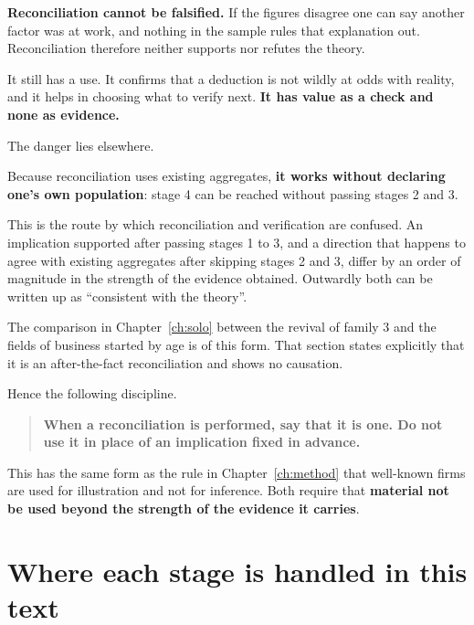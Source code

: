 \textbf{Reconciliation cannot be falsified.} If the figures disagree one can say another
factor was at work, and nothing in the sample rules that explanation out. Reconciliation
therefore neither supports nor refutes the theory.

It still has a use. It confirms that a deduction is not wildly at odds with reality, and it
helps in choosing what to verify next.
\textbf{It has value as a check and none as evidence.}

The danger lies elsewhere.

\begin{remark}
\label{rem:comparison-skips-stages}
Because reconciliation uses existing aggregates, \textbf{it works without declaring one's own
population}: stage 4 can be reached without passing stages 2 and 3.

This is the route by which reconciliation and verification are confused. An implication
supported after passing stages 1 to 3, and a direction that happens to agree with existing
aggregates after skipping stages 2 and 3, differ by an order of magnitude in the strength of
the evidence obtained. Outwardly both can be written up as ``consistent with the theory''.
\end{remark}

The comparison in Chapter~\ref{ch:solo} between the revival of family 3 and the fields of
business started by age is of this form. That section states explicitly that it is an
after-the-fact reconciliation and shows no causation.

Hence the following discipline.

\begin{quote}
\textbf{When a reconciliation is performed, say that it is one. Do not use it in place of an
implication fixed in advance.}
\end{quote}

This has the same form as the rule in Chapter~\ref{ch:method} that well-known firms are used
for illustration and not for inference. Both require that
\textbf{material not be used beyond the strength of the evidence it carries}.

\section{Where each stage is handled in this text}

